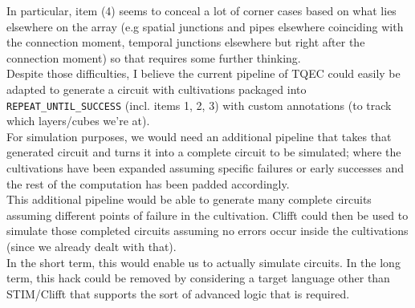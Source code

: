 \documentclass{article}
\begin{document}
	In particular, item (4) seems to conceal a lot of corner cases based on what lies elsewhere on the array (e.g spatial junctions and pipes elsewhere coinciding with the connection moment, temporal junctions elsewhere but right after the connection moment) so that requires some further thinking. \\

	Despite those difficulties, I believe the current pipeline of TQEC could easily be adapted to generate a circuit with cultivations packaged into {\tt REPEAT\_UNTIL\_SUCCESS} (incl. items 1, 2, 3) with custom annotations (to track which layers/cubes we’re at). \\

	For simulation purposes, we would need an additional pipeline that takes that generated circuit and turns it into a complete circuit to be simulated; where the cultivations have been expanded assuming specific failures or early successes and the rest of the computation has been padded accordingly. \\

	This additional pipeline would be able to generate many complete circuits assuming different points of failure in the cultivation. Clifft could then be used to simulate those completed circuits assuming no errors occur inside the cultivations (since we already dealt with that). \\

	In the short term, this would enable us to actually simulate circuits. In the long term, this hack could be removed by considering a target language other than STIM/Clifft that supports the sort of advanced logic that is required.
\end{document}
